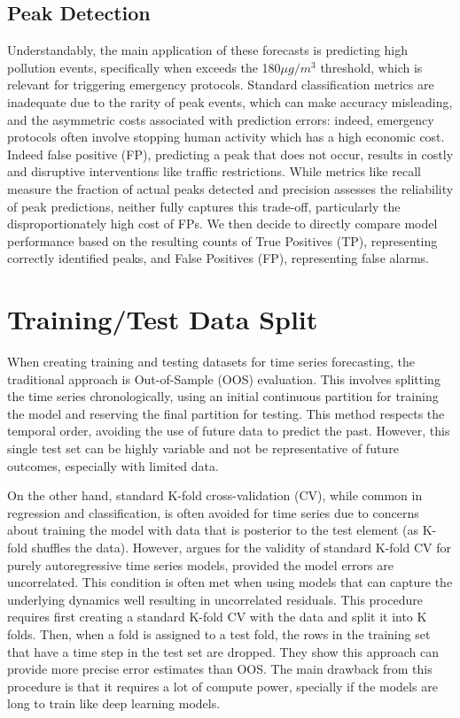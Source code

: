 \documentclass[12pt,a4paper]{book}
\begin{document}
\subsection{Peak Detection}
\label{peak_detect}
Understandably, the main application of these forecasts is predicting high pollution events, specifically when \no{} exceeds the 180$\mu g/m^3$ threshold, which is relevant for triggering emergency protocols. Standard classification metrics are inadequate due to the rarity of peak events, which can make accuracy misleading, and the asymmetric costs associated with prediction errors: indeed, emergency protocols often involve stopping human activity which has a high economic cost. Indeed false positive (FP), predicting a peak that does not occur, results in costly and disruptive interventions like traffic restrictions. While metrics like recall measure the fraction of actual peaks detected and precision assesses the reliability of peak predictions, neither fully captures this trade-off, particularly the disproportionately high cost of FPs. We then decide to directly compare model performance based on the resulting counts of True Positives (TP), representing correctly identified peaks, and False Positives (FP), representing false alarms. 

\section{Training/Test Data Split}
\label{exp:test}
When creating training and testing datasets for time series forecasting, the traditional approach is Out-of-Sample (OOS) evaluation. This involves splitting the time series chronologically, using an initial continuous partition for training the model and reserving the final partition for testing. This method respects the temporal order, avoiding the use of future data to predict the past. However, this single test set can be highly variable and not be representative of future outcomes, especially with limited data.

On the other hand, standard K-fold cross-validation (CV), while common in regression and classification, is often avoided for time series due to concerns about training the model with data that is posterior to the test element (as K-fold shuffles the data). However, \citet{bergmeir_note_2018} argues for the validity of standard K-fold CV for purely autoregressive time series models, provided the model errors are uncorrelated. This condition is often met when using models that can capture the underlying dynamics well resulting in uncorrelated residuals. This procedure requires first creating a standard K-fold CV with the data and split it into K folds. Then, when a fold is assigned to a test fold, the rows in the training set that have a time step in the test set are dropped. They show this approach can provide more precise error estimates than OOS. The main drawback from this procedure is that it requires a lot of compute power, specially if the models are long to train like deep learning models.
\end{document}
